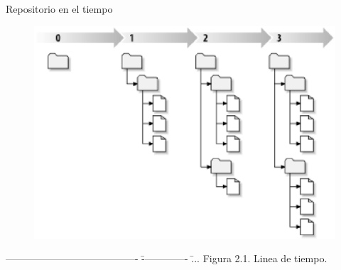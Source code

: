 \documentclass[xcolor=dvipsnames]{beamer}
\begin{document}
	\begin{frame}{Repositorio en el tiempo}
	\scriptsize
	{
	\begin{tabbing}
	\end{tabbing}
	\begin{figure}
	\centering 
		\includegraphics[scale=0.49]{svn_evolution.eps} 
	\end{figure}

	\begin{tabbing}
		---------------------------------------- \= -------------- \= ... \kill
		\> Figura 2.1. Linea de tiempo.
	\end{tabbing}
	}
	\end{frame}
\end{document}
